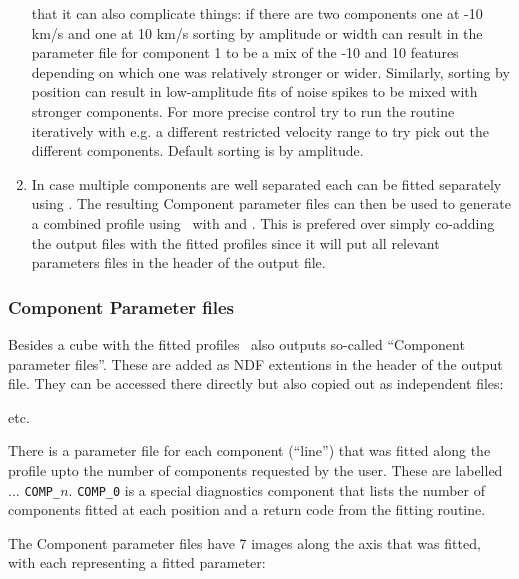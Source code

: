 \documentclass[oneside,11pt]{starlink}
\begin{document}
\begin{enumerate}
  that it can also complicate things: if there are two components one
  at -10 km/s and one at 10 km/s sorting by amplitude or width can
  result in the parameter file for component 1 to be a mix of the -10
  and 10 features depending on which one was relatively stronger or
  wider. Similarly, sorting by position can result in low-amplitude
  fits of noise spikes to be mixed with stronger components. For more
  precise control try to run the routine iteratively with e.g. a
  different restricted velocity range to try pick out the different
  components. Default sorting is by amplitude.
\item In case multiple components are well separated each can be fitted
separately using . The resulting Component parameter files
can then be used to generate a combined profile using \fitdd\ with
 and . This is prefered over
simply co-adding the output files with the fitted profiles since it
will put all relevant parameters files in the header of the output
file.
\end{enumerate}

\subsubsection{Component Parameter files}

Besides a cube with the fitted profiles \fitdd\ also outputs so-called
``Component parameter files''. These are added as NDF extentions in
the header of the output file. They can be accessed there directly but
also copied out as independent files:

\begin{terminalv}
etc.
\end{terminalv}

There is a parameter file for each component (``line'') that was
fitted along the profile upto the number of components requested by
the user. These are labelled  $\ldots$
\texttt{COMP\_$n$}. \texttt{COMP\_0} is a special diagnostics
component that lists the number of components fitted at each position
and a return code from the fitting routine.

The Component parameter files have 7 images along the axis that was
fitted, with each representing a fitted parameter:
\end{document}
